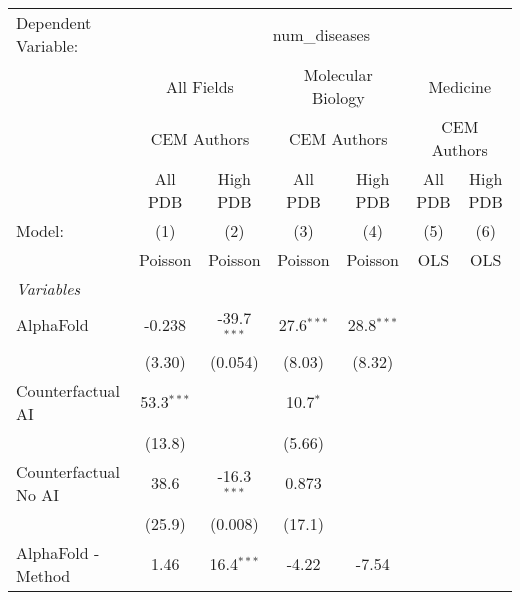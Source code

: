 \begingroup
\centering
\begin{tabular}{lcccccc}
   \tabularnewline \midrule \midrule
   Dependent Variable: & \multicolumn{6}{c}{num\_diseases}\\
 & \multicolumn{2}{c}{All Fields} & \multicolumn{2}{c}{Molecular Biology} & \multicolumn{2}{c}{Medicine} \\
\cmidrule(lr){2-3} \cmidrule(lr){4-5} \cmidrule(lr){6-7}
 & \multicolumn{2}{c}{CEM Authors} & \multicolumn{2}{c}{CEM Authors} & \multicolumn{2}{c}{CEM Authors} \\
\cmidrule(lr){2-3} \cmidrule(lr){4-5} \cmidrule(lr){6-7}
 & \multicolumn{1}{c}{All PDB} & \multicolumn{1}{c}{High PDB} & \multicolumn{1}{c}{All PDB} & \multicolumn{1}{c}{High PDB} & \multicolumn{1}{c}{All PDB} & \multicolumn{1}{c}{High PDB} \\
\cmidrule(lr){2-2} \cmidrule(lr){3-3} \cmidrule(lr){4-4} \cmidrule(lr){5-5} \cmidrule(lr){6-6} \cmidrule(lr){7-7}
   Model:                                                     & (1)           & (2)                   & (3)          & (4)          & (5)  & (6)\\  
                                                              &  Poisson      & Poisson               & Poisson      & Poisson      & OLS  & OLS\\  
   \midrule
   \emph{Variables}\\
   AlphaFold                                                  & -0.238        & -39.7$^{***}$         & 27.6$^{***}$ & 28.8$^{***}$ &      &   \\   
                                                              & (3.30)        & (0.054)               & (8.03)       & (8.32)       &      &   \\   
   Counterfactual AI                                          & 53.3$^{***}$  &                       & 10.7$^{*}$   &              &      &   \\   
                                                              & (13.8)        &                       & (5.66)       &              &      &   \\   
   Counterfactual No AI                                       & 38.6          & -16.3$^{***}$         & 0.873        &              &      &   \\   
                                                              & (25.9)        & (0.008)               & (17.1)       &              &      &   \\   
   AlphaFold - Method                                         & 1.46          & 16.4$^{***}$          & -4.22        & -7.54        &      &   \\   

\end{tabular}
